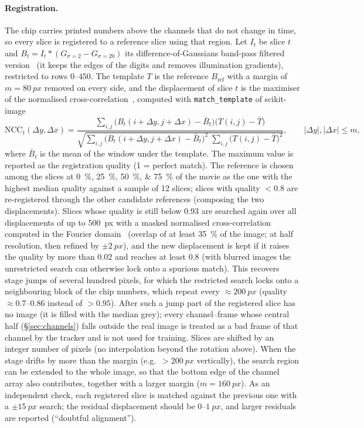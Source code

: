 \documentclass[11pt,a4paper]{article}
\begin{document}
\paragraph{Registration.} The chip carries printed numbers above the channels that do not change in time, so every slice is registered to a reference slice using that region. Let $I_t$ be slice $t$ and $B_t = I_t * (G_{\sigma=2} - G_{\sigma=20})$ its difference-of-Gaussians band-pass filtered version~\cite{marr1980} (it keeps the edges of the digits and removes illumination gradients), restricted to rows $0$--$450$. The template $T$ is the reference $B_{\mathrm{ref}}$ with a margin of $m=\SI{80}{px}$ removed on every side, and the displacement of slice $t$ is the maximiser of the normalised cross-correlation~\cite{lewis1995}, computed with \texttt{match\_template} of scikit-image~\cite{vanderwalt2014}
\begin{equation}
\mathrm{NCC}_t(\Delta y,\Delta x)=\frac{\sum_{i,j}\bigl(B_t(i+\Delta y,j+\Delta x)-\bar B_t\bigr)\bigl(T(i,j)-\bar T\bigr)}{\sqrt{\sum_{i,j}\bigl(B_t(i+\Delta y,j+\Delta x)-\bar B_t\bigr)^2\;\sum_{i,j}\bigl(T(i,j)-\bar T\bigr)^2}},\qquad |\Delta y|,|\Delta x|\le m,
\end{equation}
where $\bar B_t$ is the mean of the window under the template. The maximum value is reported as the registration quality (1 = perfect match). The reference is chosen among the slices at \SIlist{0;25;50;75}{\percent} of the movie as the one with the highest median quality against a sample of 12 slices; slices with quality $<0.8$ are re-registered through the other candidate references (composing the two displacements). Slices whose quality is still below $0.93$ are searched again over all displacements of up to \SI{500}{px} with a masked normalised cross-correlation computed in the Fourier domain~\cite{padfield2012} (overlap of at least \SI{35}{\percent} of the image; at half resolution, then refined by $\pm\SI{2}{px}$), and the new displacement is kept if it raises the quality by more than $0.02$ and reaches at least $0.8$ (with blurred images the unrestricted search can otherwise lock onto a spurious match). This recovers stage jumps of several hundred pixels, for which the restricted search locks onto a neighbouring block of the chip numbers, which repeat every $\approx\SI{200}{px}$ (quality $\approx0.7$--$0.86$ instead of $>0.95$). After such a jump part of the registered slice has no image (it is filled with the median grey); every channel--frame whose central half (\S\ref{sec:channels}) falls outside the real image is treated as a bad frame of that channel by the tracker and is not used for training. Slices are shifted by an integer number of pixels (no interpolation beyond the rotation above). When the stage drifts by more than the margin (e.g.\ $>\SI{200}{px}$ vertically), the search region can be extended to the whole image, so that the bottom edge of the channel array also contributes, together with a larger margin ($m=\SI{160}{px}$). As an independent check, each registered slice is matched against the previous one with a $\pm\SI{15}{px}$ search; the residual displacement should be $0$--$\SI{1}{px}$, and larger residuals are reported (``doubtful alignment'').
\end{document}
